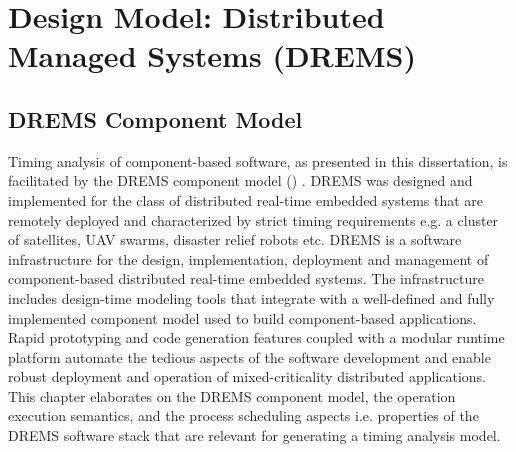 \chapter{Design Model: Distributed Managed Systems (DREMS)}
\label{chapter:DREMS}

\section{DREMS Component Model}

Timing analysis of component-based software, as presented in this dissertation, is facilitated by the DREMS component model (\iapfull) \cite{DREMS13Software} \cite{ISIS_F6_ISORC:13}. DREMS was designed and implemented for the class of distributed real-time embedded systems that are remotely deployed and characterized by strict timing requirements e.g. a cluster of satellites, UAV swarms, disaster relief robots etc. DREMS is a software infrastructure for the design, implementation, deployment and management of component-based distributed real-time embedded systems. The infrastructure includes design-time modeling tools \cite{ISIS_F6_SFFMT:13} that integrate with a well-defined and fully implemented component model \cite{ISIS_F6_ISORC:13, kumar2014colored} used to build component-based applications. Rapid prototyping and code generation features coupled with a modular runtime platform automate the tedious aspects of the software development and enable robust deployment and operation of mixed-criticality distributed applications. This chapter elaborates on the DREMS component model, the operation execution semantics, and the process scheduling aspects i.e. properties of the DREMS software stack that are relevant for generating a timing analysis model.


